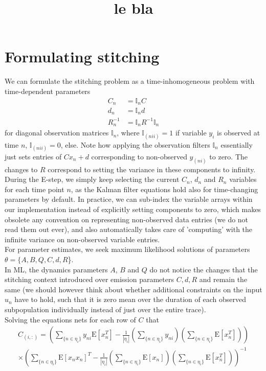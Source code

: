 \documentclass[10pt,letterpaper]{article}
\date{}
\begin{document}
\title{le bla}
\maketitle

\section{Formulating stitching}

We can formulate the stitching problem as a time-inhomogeneous problem with time-dependent parameters 
\begin{align}
C_n &= \mathbb{I}_n C \\
d_n &= \mathbb{I}_n d \\
R^{-1}_n &= \mathbb{I}_n  R^{-1} \mathbb{I}_n 
\end{align}
for diagonal observation matrices $\mathbb{I}_n$, where $\mathbb{I}_{(nii)} = 1$ if variable  $y_i$ is observed at time $n$, $\mathbb{I}_{(nii)} = 0$, else. Note how applying the observation filters $\mathbb{I}_n$ essentially just sets entries of $C x_n +d$ corresponding to non-observed $y_{(ni)}$ to zero. The changes to $R$ correspond to setting the variance in these components to infinity. \\
During the E-step, we simply keep selecting the current $C_n$, $d_n$ and $R_n$ variables for each time point $n$, as the Kalman filter equations hold also for time-changing parameters by default. In practice, we can sub-index the variable arrays within our implementation instead of explicitly setting components to zero, which makes obsolete any convention on representing non-observed data entries (we do not read them out ever), and also automatically takes care of 'computing' with the infinite variance on non-observed variable entries. \\
For parameter estimates, we seek maximum likelihood solutions of parameters 
$\theta = \{A, B, Q, C, d, R$\}. \\
In ML, the dynamics parameters $A$, $B$ and $Q$ do not notice the changes that the stitching context introduced over emission parameters $C,d,R$ and remain the same (we should however think about whether additional constraints on the input $u_n$ have to hold, such that it is zero mean over the duration of each observed subpopulation individually instead of just over the entire trace). \\
Solving the equations nets for each row of $C$ that 
\begin{align}
C_{(i,:)} = \left( \sum_{\{n \in \eta_i \}} y_{ni} \mbox{E}[x_n^T] - \frac{1}{|\eta_i|} \left(\sum_{\{n \in \eta_i \}} y_{ni}\right) \left(\sum_{\{n \in \eta_i \}} \mbox{E}[x_n^T]\right) \right) \\
\label{eq:ML_stitching_C}
\times \left( \sum_{\{n \in \eta_i \}} \mbox{E}[x_n x_n]^T  - \frac{1}{|\eta_i|} \left( \sum_{\{n \in \eta_i \}} \mbox{E}[x_n] \right) \left( \sum_{\{n \in \eta_i \}} \mbox{E}[x_n^T] \right) \right)^{-1} \nonumber
\end{align}
\end{document}
